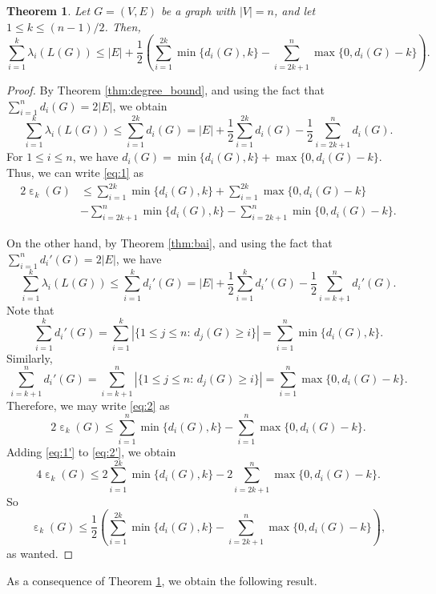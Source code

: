 \documentclass[a4paper,11pt]{article}
\theoremstyle{plain}
\newtheorem{theorem}{\bf Theorem}
\theoremstyle{definition}
\numberwithin{theorem}{section}
\numberwithin{equation}{section}
\DeclareMathOperator{\eps}{\varepsilon}
\begin{document}
\begin{theorem}\label{thm:main+bai}
    Let $G=(V,E)$ be a graph with $|V|=n$, and let $1\le k\le (n-1)/2$. Then,
    \[
        \sum_{i=1}^k \lambda_i(L(G)) \le |E|+\frac{1}{2}\left( \sum_{i=1}^{2k} \min\{d_i(G),k\} - \sum_{i=2k+1}^n \max\{0,d_i(G)-k\}\right).
    \]
\end{theorem}
\begin{proof}
    By Theorem \ref{thm:degree_bound}, and using the fact that $\sum_{i=1}^n d_i(G)=2|E|$, we obtain
\begin{equation}\label{eq:1}
    \sum_{i=1}^k \lambda_i(L(G)) \le \sum_{i=1}^{2k} d_i(G) = |E| +\frac{1}{2}\sum_{i=1}^{2k}d_i(G) -\frac{1}{2}\sum_{i=2k+1}^{n} d_i(G).
\end{equation}
For $1\le i\le n$, we have $d_i(G)=\min\{d_i(G),k\}+\max\{0,d_i(G)-k\}$. Thus, we can write \eqref{eq:1} as
\begin{align}\label{eq:1'}
    2\eps_k(G) &\le \sum_{i=1}^{2k}\min\{d_i(G),k\} +  \sum_{i=1}^{2k}\max\{0,d_i(G)-k\}  \nonumber
    \\&-\sum_{i=2k+1}^n\min \{d_i(G),k\} - \sum_{i=2k+1}^n \min\{0,d_i(G)-k\}.
\end{align}

On the other hand, by Theorem \ref{thm:bai}, and using the fact that $\sum_{i=1}^n d_i'(G)=2|E|$, we have
\begin{equation}\label{eq:2}
    \sum_{i=1}^k \lambda_i(L(G))\le \sum_{i=1}^k d_i'(G) = |E|+ \frac{1}{2} \sum_{i=1}^k d_i'(G) - \frac{1}{2}\sum_{i=k+1}^n d_i'(G).
\end{equation}
Note that
\[
    \sum_{i=1}^k d_i'(G) = \sum_{i=1}^k |\{1\le j\le n:\, d_j(G)\ge i\}| = \sum_{i=1}^n \min\{d_i(G),k\}.
\]
Similarly,
\[
    \sum_{i=k+1}^n d_i'(G) = \sum_{i=k+1}^n |\{1\le j\le n:\, d_j(G)\ge i\}| = \sum_{i=1}^n \max\{0,d_i(G)-k\}.
\]
Therefore, we may write \eqref{eq:2} as
\begin{equation}\label{eq:2'}
    2\eps_k(G)\le  \sum_{i=1}^n \min\{d_i(G),k\}- \sum_{i=1}^n \max\{0,d_i(G)-k\}.
\end{equation}
Adding \eqref{eq:1'} to \eqref{eq:2'}, we obtain
\[
    4 \eps_k(G)\le 2 \sum_{i=1}^{2k} \min\{d_i(G),k\} - 2\sum_{i=2k+1}^n \max\{0,d_i(G)-k\}.
\]
So
\[
\eps_k(G)\le \frac{1}{2}\left(\sum_{i=1}^{2k} \min\{d_i(G),k\} - \sum_{i=2k+1}^n \max\{0,d_i(G)-k\}\right),
\]
as wanted.
\end{proof}


As a consequence of Theorem \ref{thm:main+bai}, we obtain the following result.
\end{document}
